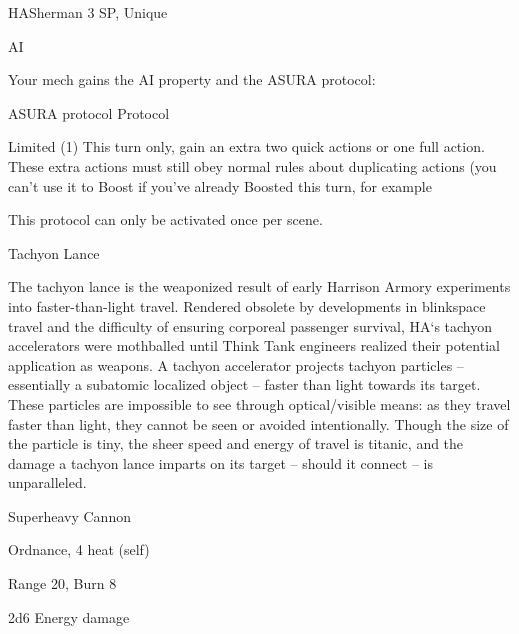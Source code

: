 \begin{mech}{HA}{Sherman}
3 SP, Unique

AI

Your mech gains the AI property and the ASURA protocol:

ASURA protocol
Protocol

Limited (1)
This turn only, gain an extra two quick actions or one full action. These extra actions must still obey normal rules about duplicating actions (you can’t use it to Boost if you’ve already Boosted this turn, for example

This protocol can only be activated once per scene.


Tachyon Lance

The tachyon lance is the weaponized result of early Harrison Armory experiments into faster-than-light travel. Rendered obsolete by developments in blinkspace travel and the difficulty of ensuring corporeal passenger survival, HA‘s tachyon accelerators were mothballed until Think Tank engineers realized their potential application as weapons. A tachyon accelerator projects tachyon particles -- essentially a subatomic localized object -- faster than light towards its target. These particles are impossible to see through optical/visible means: as they travel faster than light, they cannot be seen or avoided intentionally. Though the size of the particle is tiny, the sheer speed and energy of travel is titanic, and the damage a tachyon lance imparts on its target -- should it connect -- is unparalleled.

Superheavy Cannon

Ordnance, 4 heat (self)

Range 20, Burn 8

2d6 Energy damage

\end{mech}